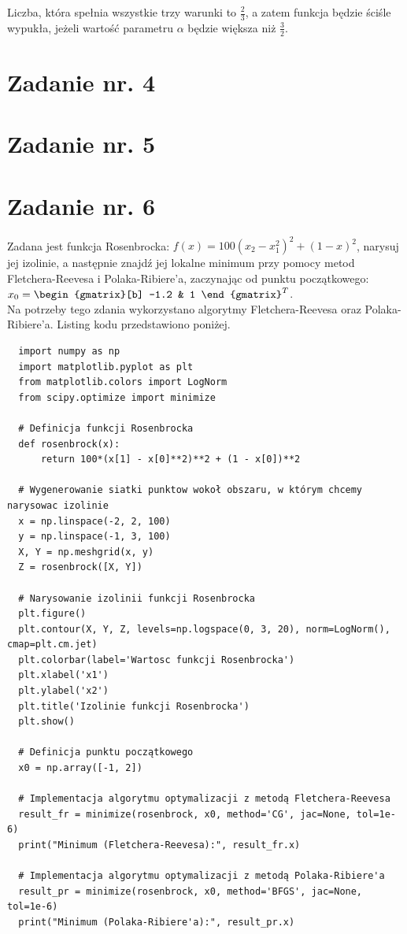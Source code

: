 \documentclass{article}
\begin{document}
Liczba, która spełnia wszystkie trzy warunki to $\frac{2}{3}$, a zatem funkcja będzie ściśle
wypukła, jeżeli wartość parametru $\alpha$ będzie większa niż $\frac{3}{2}$.

\section{Zadanie nr. 4}

\section{Zadanie nr. 5}

\section{Zadanie nr. 6}

Zadana jest funkcja Rosenbrocka: $f(x)=100(x_2-x_1^2)^2+(1-x)^2$, narysuj
jej izolinie, a następnie znajdź jej lokalne minimum przy pomocy metod Fletchera-Reevesa
i Polaka-Ribiere'a, zaczynając od punktu początkowego: $x_0=\begin{gmatrix}[b]
  -1.2 & 1
\end{gmatrix}^T$.\\

Na potrzeby tego zdania wykorzystano algorytmy Fletchera-Reevesa
oraz Polaka-Ribiere’a. Listing kodu przedstawiono poniżej.

\begin{lstlisting}
  import numpy as np
  import matplotlib.pyplot as plt
  from matplotlib.colors import LogNorm
  from scipy.optimize import minimize
  
  # Definicja funkcji Rosenbrocka
  def rosenbrock(x):
      return 100*(x[1] - x[0]**2)**2 + (1 - x[0])**2
  
  # Wygenerowanie siatki punktow wokoł obszaru, w którym chcemy narysowac izolinie
  x = np.linspace(-2, 2, 100)
  y = np.linspace(-1, 3, 100)
  X, Y = np.meshgrid(x, y)
  Z = rosenbrock([X, Y])
  
  # Narysowanie izolinii funkcji Rosenbrocka
  plt.figure()
  plt.contour(X, Y, Z, levels=np.logspace(0, 3, 20), norm=LogNorm(), cmap=plt.cm.jet)
  plt.colorbar(label='Wartosc funkcji Rosenbrocka')
  plt.xlabel('x1')
  plt.ylabel('x2')
  plt.title('Izolinie funkcji Rosenbrocka')
  plt.show()
  
  # Definicja punktu początkowego
  x0 = np.array([-1, 2])
  
  # Implementacja algorytmu optymalizacji z metodą Fletchera-Reevesa
  result_fr = minimize(rosenbrock, x0, method='CG', jac=None, tol=1e-6)
  print("Minimum (Fletchera-Reevesa):", result_fr.x)
  
  # Implementacja algorytmu optymalizacji z metodą Polaka-Ribiere'a
  result_pr = minimize(rosenbrock, x0, method='BFGS', jac=None, tol=1e-6)
  print("Minimum (Polaka-Ribiere'a):", result_pr.x)
\end{lstlisting}  
\end{document}
